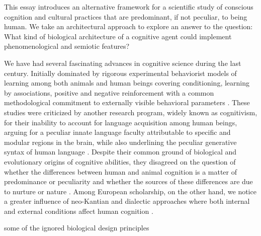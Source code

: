 This essay introduces an alternative framework for a scientific study of conscious cognition and cultural practices that are predominant, if not peculiar, to being human.  We take an architectural approach to explore an answer to the question: What kind of biological architecture of a cognitive agent could implement phenomenological and semiotic features? 

We have had several fascinating advances in cognitive science during the last century. 
Initially dominated by rigorous experimental behaviorist models of learning among both animals and human beings covering conditioning, learning by associations, positive and negative reinforcement with a common methodological commitment to externally visible behavioral parameters \citep{pavlov1927, skinner1938, skinner1953science, thorndike1898, watson1913psychology}.  These studies were criticized by another research program, widely known as cognitivism, for their inability to account for language acquisition among human beings, arguing for a peculiar innate language faculty attributable to specific and modular regions in the brain, while also underlining the peculiar generative syntax of human language \citep{chomsky1965aspects, chomsky1986knowledge, fodor1975language, fodor_modularity_1983, pinker1994language, pinker1997mind}. Despite their common ground of biological and evolutionary origins of cognitive abilities, they disagreed on the question of whether the differences between human and animal cognition is a matter of predominance or peculiarity and whether the sources of these differences are due to nurture or nature \citep{chomsky1975reflections, pinker2002blankslate, watson1924behaviorism, skinner1971beyond}. Among European scholarship, on the other hand, we notice a greater influence of neo-Kantian and dialectic approaches where both internal and external conditions affect human cognition \citep{piaget-biology-knowledge, piaget1970genetic, ponty1969phenomenology, Merleau-Ponty2013-vs, Vygotsky1978-bk}.    


some of the ignored biological design principles 



